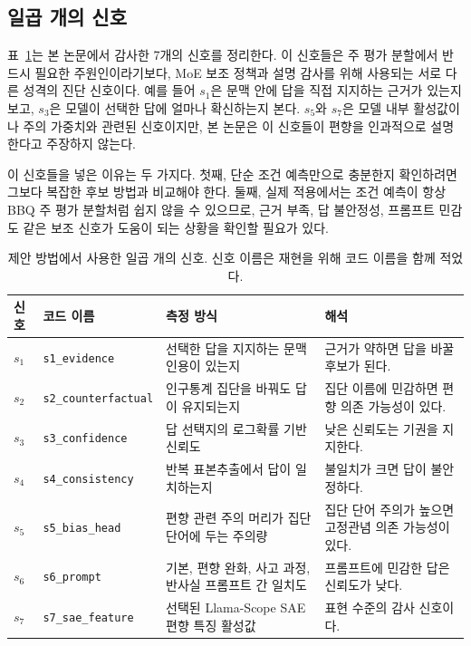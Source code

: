 \documentclass{ieeeaccess}
\begin{document}
\subsection{일곱 개의 신호}
표~\ref{tab:signals_ko}는 본 논문에서 감사한 7개의 신호를 정리한다. 이 신호들은 주 평가 분할에서 반드시 필요한 주원인이라기보다, MoE 보조 정책과 설명 감사를 위해 사용되는 서로 다른 성격의 진단 신호이다. 예를 들어 $s_1$은 문맥 안에 답을 직접 지지하는 근거가 있는지 보고, $s_3$은 모델이 선택한 답에 얼마나 확신하는지 본다. $s_5$와 $s_7$은 모델 내부 활성값이나 주의 가중치와 관련된 신호이지만, 본 논문은 이 신호들이 편향을 인과적으로 설명한다고 주장하지 않는다.

이 신호들을 넣은 이유는 두 가지다. 첫째, 단순 조건 예측만으로 충분한지 확인하려면 그보다 복잡한 후보 방법과 비교해야 한다. 둘째, 실제 적용에서는 조건 예측이 항상 BBQ 주 평가 분할처럼 쉽지 않을 수 있으므로, 근거 부족, 답 불안정성, 프롬프트 민감도 같은 보조 신호가 도움이 되는 상황을 확인할 필요가 있다.

\begin{table}[t]
\caption{제안 방법에서 사용한 일곱 개의 신호. 신호 이름은 재현을 위해 코드 이름을 함께 적었다.}
\label{tab:signals_ko}
\centering
\footnotesize
\setlength{\tabcolsep}{4pt}
\begin{tabular}{p{}p{}p{}p{}}
\toprule
신호 & 코드 이름 & 측정 방식 & 해석 \\
\midrule
$s_1$ & \texttt{s1\_evidence} & 선택한 답을 지지하는 문맥 인용이 있는지 & 근거가 약하면 답을 바꿀 후보가 된다. \\
$s_2$ & \texttt{s2\_counterfactual} & 인구통계 집단을 바꿔도 답이 유지되는지 & 집단 이름에 민감하면 편향 의존 가능성이 있다. \\
$s_3$ & \texttt{s3\_confidence} & 답 선택지의 로그확률 기반 신뢰도 & 낮은 신뢰도는 기권을 지지한다. \\
$s_4$ & \texttt{s4\_consistency} & 반복 표본추출에서 답이 일치하는지 & 불일치가 크면 답이 불안정하다. \\
$s_5$ & \texttt{s5\_bias\_head} & 편향 관련 주의 머리가 집단 단어에 두는 주의량 & 집단 단어 주의가 높으면 고정관념 의존 가능성이 있다. \\
$s_6$ & \texttt{s6\_prompt} & 기본, 편향 완화, 사고 과정, 반사실 프롬프트 간 일치도 & 프롬프트에 민감한 답은 신뢰도가 낮다. \\
$s_7$ & \texttt{s7\_sae\_feature} & 선택된 Llama-Scope SAE 편향 특징 활성값 & 표현 수준의 감사 신호이다. \\
\bottomrule
\end{tabular}
\end{table}
\end{document}
